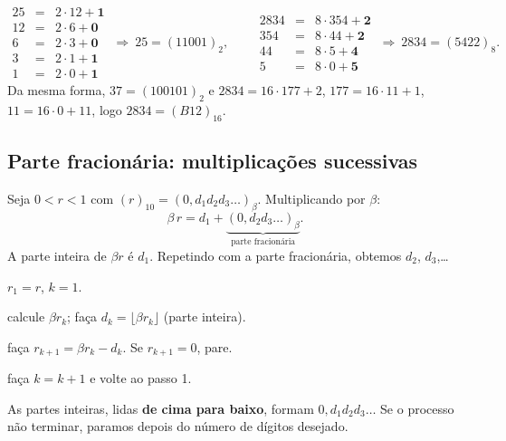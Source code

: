 \begin{exemplo}
\[
\begin{array}{rcl}
25&=&2\cdot12+\mathbf{1}\\
12&=&2\cdot6+\mathbf{0}\\
6&=&2\cdot3+\mathbf{0}\\
3&=&2\cdot1+\mathbf{1}\\
1&=&2\cdot0+\mathbf{1}
\end{array}
\ \Rightarrow\ 25=(11001)_2,
\qquad
\begin{array}{rcl}
2834&=&8\cdot354+\mathbf{2}\\
354&=&8\cdot44+\mathbf{2}\\
44&=&8\cdot5+\mathbf{4}\\
5&=&8\cdot0+\mathbf{5}
\end{array}
\ \Rightarrow\ 2834=(5422)_8 .
\]
Da mesma forma, $37=(100101)_2$ e $2834=16\cdot177+2$, $177=16\cdot11+1$, $11=16\cdot0+11$,
logo $2834=(B12)_{16}$.
\end{exemplo}

\subsection{Parte fracionária: multiplicações sucessivas}

Seja $0<r<1$ com $(r)_{10}=(0{,}d_1d_2d_3\dots)_\beta$. Multiplicando por $\beta$:
\[
\beta\,r=d_1+\underbrace{(0{,}d_2d_3\dots)_\beta}_{\text{parte fracionária}} .
\]
A parte inteira de $\beta r$ é $d_1$. Repetindo com a parte fracionária, obtemos $d_2$, $d_3$,\dots

\begin{tcolorbox}[colback=azul!3,colframe=azul!60,title={Algoritmo: fração decimal $\to$ base $\beta$},fonttitle=\bfseries]
\begin{description}[nosep,font=\normalfont\bfseries]
  \item[Passo 0:] $r_1=r$, $k=1$.
  \item[Passo 1:] calcule $\beta r_k$; faça $d_k=\lfloor\beta r_k\rfloor$ (parte inteira).
  \item[Passo 2:] faça $r_{k+1}=\beta r_k-d_k$. Se $r_{k+1}=0$, pare.
  \item[Passo 3:] faça $k=k+1$ e volte ao passo 1.
\end{description}
As partes inteiras, lidas \textbf{de cima para baixo}, formam $0{,}d_1d_2d_3\dots$ Se o processo não
terminar, paramos depois do número de dígitos desejado.
\end{tcolorbox}

